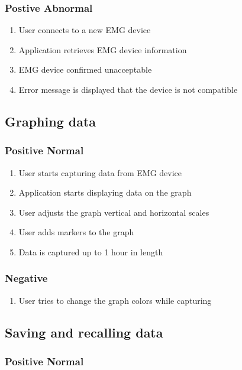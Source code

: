 \documentclass[12pt,a4paper]{article}
\begin{document}
\subsubsection{Postive Abnormal}

\begin{enumerate}
	\item User connects to a new EMG device
	\item Application retrieves EMG device information
	\item EMG device confirmed unacceptable
	\item Error message is displayed that the device is not compatible 
\end{enumerate}

\subsection{Graphing data}

\subsubsection{Positive Normal}

\begin{enumerate}
	\item User starts capturing data from EMG device
	\item Application starts displaying data on the graph
	\item User adjusts the graph vertical and horizontal scales
	\item User adds markers to the graph
	\item Data is captured up to 1 hour in length
\end{enumerate}

\subsubsection{Negative}

\begin{enumerate}
	\item User tries to change the graph colors while capturing
\end{enumerate}

\subsection{Saving and recalling data}

\subsubsection{Positive Normal}
\end{document}
